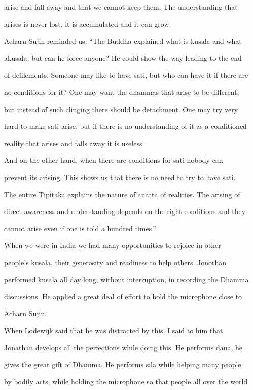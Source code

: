 arise  and  fall  away  and  that we  cannot  keep  them.  The  understanding  that  

arises is never lost, it is accumulated and it can grow. 

   Acharn Sujin reminded us: “The Buddha explained what is kusala and what  

akusala, but can he force anyone? He could show the way leading to the end  

of defilements. Someone may like to have sati, but who can have it if there are  

no  conditions  for  it?  One  may want the  dhammas that  arise to be  different,  

but  instead  of  such  clinging  there  should be  detachment.  One  may  try very  

hard to make sati arise, but if there is no understanding of it as a conditioned  

reality that arises and falls away it is useless. 

   And   on  the   other  hand,   when   there   are  conditions   for  sati  nobody  can  

prevent its arising. This shows us that there is no need to try to have sati. 

   The entire Tipiṭaka explains the nature of anattā of realities. The arising of  

direct awareness and understanding depends on the right conditions and they  

cannot arise even if one is told a hundred times.” 

   When  we   were   in   India  we   had   many   opportunities  to   rejoice  in  other  

people’s   kusala,   their   generosity   and   readiness   to   help   others.   Jonothan  

performed kusala all day long, without interruption, in recording the Dhamma  

discussions. He applied a great deal of effort to hold the microphone close to  

Acharn Sujin. 

   When   Lodewijk   said  that   he   was   distracted   by   this,   I   said   to   him   that  

Jonathan develops all the perfections while doing this. He performs dāna, he  

gives the great gift of Dhamma. He performs  sīla while helping many people  

by bodily acts, while holding the microphone so that people all over the world  

